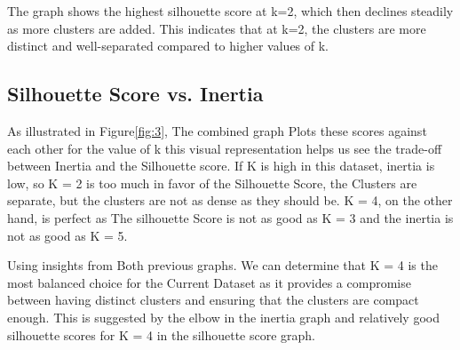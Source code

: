 The graph shows the highest silhouette score at k=2, which then declines steadily as more clusters are added.
This indicates that at k=2, the clusters are more distinct and well-separated compared to higher values of k.

\subsection{Silhouette Score vs. Inertia}\label{subsec:silhouette-score-vs.-inertia}



As illustrated in Figure\ref{fig:3}, The combined graph Plots these scores against each other for the value of k this visual representation helps us see the
trade-off between Inertia and the Silhouette score.
If K is high in this dataset, inertia is low, so K = 2 is too much in favor of the Silhouette Score, the Clusters are separate, but the
clusters are not as dense as they should be.
K = 4, on the other hand, is perfect as The silhouette Score is not as good as K = 3 and the inertia is not as good as K = 5.

Using insights from Both previous graphs.
We can determine that K = 4 is the most balanced choice for the Current Dataset as
it provides a compromise between having distinct clusters and ensuring that the clusters are compact enough\cite{studentResults2022}.
This is suggested by the elbow in the inertia graph and relatively good silhouette scores for K = 4 in the silhouette score graph.

